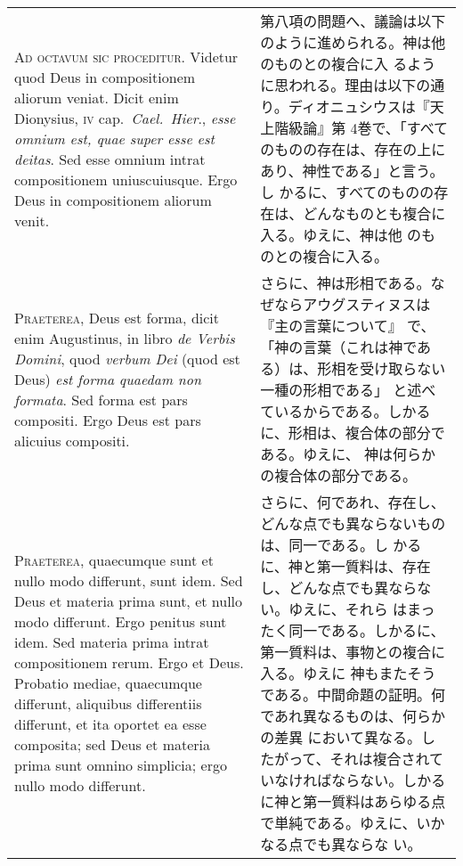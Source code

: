 \documentclass[10pt]{jsarticle}
\begin{document}
\begin{longtable}{p{21em}p{21em}}

{\huge A}{\scshape d octavum sic proceditur}. Videtur quod Deus in
 compositionem aliorum veniat. Dicit enim Dionysius, {\scshape iv}
 cap.~{\itshape Cael.~Hier}., {\itshape esse omnium est, quae super
 esse est deitas}. Sed esse omnium intrat compositionem
 uniuscuiusque. Ergo Deus in compositionem aliorum venit.

&

第八項の問題へ、議論は以下のように進められる。神は他のものとの複合に入
るように思われる。理由は以下の通り。ディオニュシウスは『天上階級論』第
4巻で、「すべてのものの存在は、存在の上にあり、神性である」と言う。し
かるに、すべてのものの存在は、どんなものとも複合に入る。ゆえに、神は他
のものとの複合に入る。

\\



{\scshape Praeterea}, Deus est forma, dicit enim Augustinus, in libro
 {\itshape de Verbis Domini}, quod {\itshape verbum Dei} (quod est
 Deus) {\itshape est forma quaedam non formata}. Sed forma est pars
 compositi. Ergo Deus est pars alicuius compositi.

&

さらに、神は形相である。なぜならアウグスティヌスは『主の言葉について』
で、「神の言葉（これは神である）は、形相を受け取らない一種の形相である」
と述べているからである。しかるに、形相は、複合体の部分である。ゆえに、
神は何らかの複合体の部分である。

\\

{\scshape Praeterea}, quaecumque sunt et nullo modo differunt, sunt
 idem. Sed Deus et materia prima sunt, et nullo modo differunt. Ergo
 penitus sunt idem. Sed materia prima intrat compositionem rerum. Ergo
 et Deus. Probatio mediae, quaecumque differunt, aliquibus differentiis
 differunt, et ita oportet ea esse composita; sed Deus et materia prima
 sunt omnino simplicia; ergo nullo modo differunt.

&

さらに、何であれ、存在し、どんな点でも異ならないものは、同一である。し
かるに、神と第一質料は、存在し、どんな点でも異ならない。ゆえに、それら
はまったく同一である。しかるに、第一質料は、事物との複合に入る。ゆえに
神もまたそうである。中間命題の証明。何であれ異なるものは、何らかの差異
において異なる。したがって、それは複合されていなければならない。しかる
に神と第一質料はあらゆる点で単純である。ゆえに、いかなる点でも異ならな
い。


\end{longtable}
\end{document}
